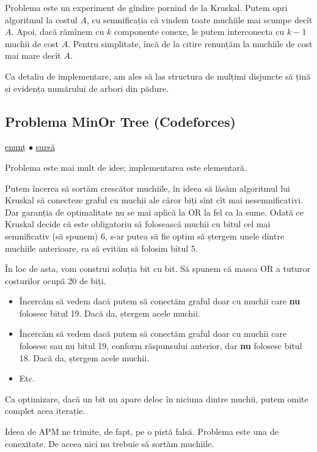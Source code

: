 \documentclass[../main.tex]{subfiles}
\begin{document}
Problema este un experiment de gîndire pornind de la Kruskal. Putem opri algoritmul la costul $A$, cu semnificația că vindem toate muchiile mai scumpe decît $A$. Apoi, dacă rămînem cu $k$ componente conexe, le putem interconecta cu $k-1$ muchii de cost $A$. Pentru simplitate, încă de la citire renunțăm la muchiile de cost mai mare decît $A$.

Ca detaliu de implementare, am ales să las structura de mulțimi disjuncte să țină și evidența numărului de arbori din pădure.

\subsection{Problema MinOr Tree (Codeforces)}
\label{problem:minor-tree}

\href{https://codeforces.com/contest/1624/problem/G}{enunț}
$\bullet$
\hyperref[code:minor-tree]{sursă}

Problema este mai mult de idee; implementarea este elementară.

Putem încerca să sortăm crescător muchiile, în ideea să lăsăm algoritmul lui Kruskal să conecteze graful cu muchii ale căror biți sînt cît mai nesemnificativi. Dar garanția de optimalitate nu se mai aplică la OR la fel ca la sume. Odată ce Kruskal decide că este obligatoriu să folosească muchii cu bitul cel mai semnificativ (să spunem) 6, s-ar putea să fie optim să ștergem unele dintre muchiile anterioare, ca să evităm să folosim bitul 5.

În loc de asta, vom construi soluția bit cu bit. Să spunem că masca OR a tuturor costurilor ocupă 20 de biți.

\begin{itemize}
  \item Încercăm să vedem dacă putem să conectăm graful doar cu muchii care \textbf{nu} folosesc bitul 19. Dacă da, ștergem acele muchii.

  \item Încercăm să vedem dacă putem să conectăm graful doar cu muchii care folosesc sau nu bitul 19, conform răspunsului anterior, dar \textbf{nu} folosesc bitul 18. Dacă da, ștergem acele muchii.

  \item Etc.
\end{itemize}

Ca optimizare, dacă un bit nu apare deloc în niciuna dintre muchii, putem omite complet acea iterație.

Ideea de APM ne trimite, de fapt, pe o pistă falsă. Problema este una de conexitate. De aceea nici nu trebuie să sortăm muchiile.
\end{document}
